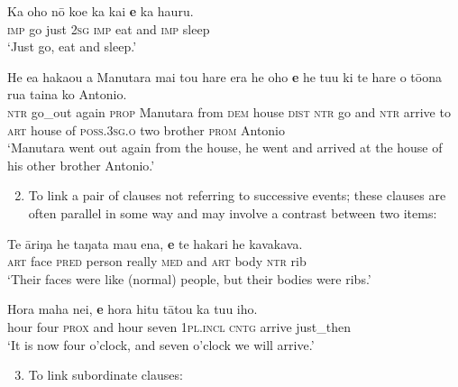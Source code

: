 \ea\label{ex:11.6}
\gll Ka oho nō koe ka kai \textbf{{\ꞌ}e} ka ha{\ꞌ}uru. \\
\textsc{imp} go just \textsc{2sg} \textsc{imp} eat and \textsc{imp} sleep \\

\glt 
‘Just go, eat and sleep.’ \textstyleExampleref{[R304.013]} 
\z

\ea\label{ex:11.7}
\gll He e{\ꞌ}a haka{\ꞌ}ou a Manutara mai tou hare era he oho \textbf{{\ꞌ}e} he tu{\ꞌ}u  ki te hare o tō{\ꞌ}ona rua taina ko {\ꞌ}Antonio.\\
\textsc{ntr} go\_out again \textsc{prop} Manutara from \textsc{dem} house \textsc{dist} \textsc{ntr} go and \textsc{ntr} arrive  to \textsc{art} house of \textsc{poss.3sg.o} two brother \textsc{prom} Antonio\\

\glt
‘Manutara went out again from the house, he went and arrived at the house of his other brother Antonio.’ \textstyleExampleref{[R309.083]} 
\z

\begin{enumerate}
\setcounter{enumi}{1}
\item 
To link a pair of clauses not referring to successive events; these clauses are often parallel in some way and may involve a contrast between two items:
\end{enumerate}

\ea\label{ex:11.8}
\gll Te {\ꞌ}āriŋa he taŋata mau ena, \textbf{{\ꞌ}e} te hakari he kavakava. \\
\textsc{art} face \textsc{pred} person really \textsc{med} and \textsc{art} body \textsc{ntr} rib \\

\glt 
‘Their faces were like (normal) people, but their bodies were ribs.’ \textstyleExampleref{[R233.021]} 
\z

\ea\label{ex:11.9}
\gll Hora maha nei, \textbf{{\ꞌ}e} hora hitu tātou ka tu{\ꞌ}u iho. \\
hour four \textsc{prox} and hour seven \textsc{1pl.incl} \textsc{cntg} arrive just\_then \\

\glt
‘It is now four o’clock, and seven o’clock we will arrive.’ \textstyleExampleref{[R210.198]} 
\z

\begin{enumerate}
\setcounter{enumi}{2}
\item 
To link subordinate clauses:
\end{enumerate}


